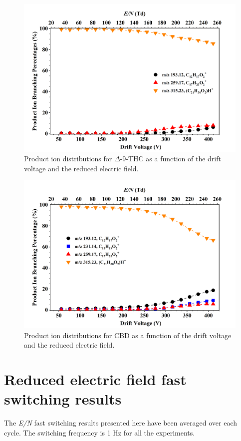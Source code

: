 
\begin{figure}[htb]
\centering
\includegraphics[width=0.8\linewidth]{pics/other_drugs/THC-br.png}
\caption{Product ion distributions for $\Delta$-9-THC as a function of the drift voltage and the reduced electric field.}
\label{fig:DR_THC}
\end{figure}



\begin{figure}[htb]
\centering
\includegraphics[width=0.8\linewidth]{pics/other_drugs/CBD-br.png}
\caption{Product ion distributions for CBD as a function of the drift voltage and the reduced electric field.}
\label{fig:DR_CBD}
\end{figure}





\section{Reduced electric field fast switching results}
The \textit{E/N} fast switching results presented here have been averaged over each cycle.
%
The switching frequency is 1 Hz for all the experiments.


